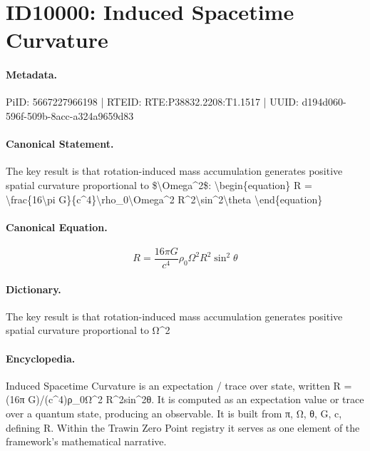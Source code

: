 \section*{ID10000: Induced Spacetime Curvature}
\paragraph{Metadata.}
PiID: 5667227966198 | RTEID: RTE:P38832.2208:T1.1517 | UUID: d194d060-596f-509b-8acc-a324a9659d83

\paragraph{Canonical Statement.}
The key result is that rotation-induced mass accumulation generates positive spatial curvature proportional to \$\textbackslash{}Omega\textasciicircum{}2\$: \textbackslash{}begin\{equation\} R = \textbackslash{}frac\{16\textbackslash{}pi G\}\{c\textasciicircum{}4\}\textbackslash{}rho\_0\textbackslash{}Omega\textasciicircum{}2 R\textasciicircum{}2\textbackslash{}sin\textasciicircum{}2\textbackslash{}theta \textbackslash{}end\{equation\}

\paragraph{Canonical Equation.}
\[
R = \frac{16\pi G}{c^4}\rho_0\Omega^2 R^2\sin^2\theta
\]

\paragraph{Dictionary.}
The key result is that rotation-induced mass accumulation generates positive spatial curvature proportional to Ω\textasciicircum{}2

\paragraph{Encyclopedia.}
Induced Spacetime Curvature is an expectation / trace over state, written R = (16π G)/(c\textasciicircum{}4)ρ\_0Ω\textasciicircum{}2 R\textasciicircum{}2sin\textasciicircum{}2θ. It is computed as an expectation value or trace over a quantum state, producing an observable. It is built from π, Ω, θ, G, c, defining R. Within the Trawin Zero Point registry it serves as one element of the framework's mathematical narrative.
